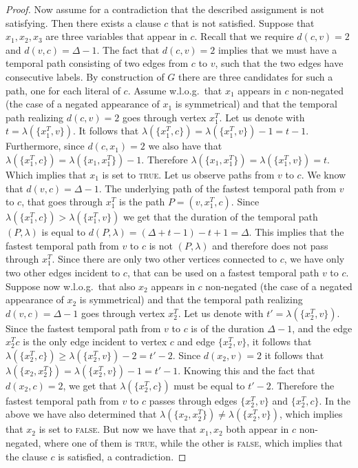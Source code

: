 \documentclass[a4paper,UKenglish,cleveref, autoref, thm-restate]{lipics-v2021}
\begin{document}
\begin{proof}
Now assume for a contradiction that the described assignment is not satisfying. Then there exists a clause $c$ that is not satisfied. 
Suppose that $x_1, x_2, x_3$ are three variables that appear in $c$.
Recall that we require $d(c,v)=2$ and $d(v,c)=\Delta -1$. 
The fact that $d(c,v)=2$ implies that we must have a temporal path consisting of two edges from $c$ to $v$, 
such that the two edges have consecutive labels. 
By construction of $G$ there are three candidates for such a path, one for each literal of $c$. 
Assume w.l.o.g.\ that $x_1$ appears in $c$ non-negated (the case of a negated appearance of $x_1$ is symmetrical) and that the temporal path realizing $d(c,v)=2$ goes through vertex $x_1^T$. 
Let us denote with $t = \lambda(\{x_1^T, v\})$.
It follows that $\lambda(\{x_1^T, c\})=\lambda(\{x_1^T, v\})-1 = t - 1$.
Furthermore, since $d(c,x_1)=2$ we also have that $\lambda(\{x_1^T, c\})=\lambda(\{x_1, x_1^T\})-1$. 
Therefore $\lambda(\{x_1, x_1^T\})=\lambda(\{x_1^T, v\}) = t$. 
Which implies that $x_1$ is set to \textsc{true}.
%
Let us observe paths from $v$ to $c$.
We know that $d(v,c)=\Delta -1$.
The underlying path of the fastest temporal path from $v$ to $c$, that goes through $x_1^T$ is the path $P = (v,x_1^T,c)$.
Since $\lambda(\{x_1^T,c\}) > \lambda(\{x_1^T, v\})$ we get that the duration of the temporal path $(P,\lambda)$ is equal to 
$d(P,\lambda)= (\Delta + t-1) - t + 1 = \Delta$.
This implies that
the fastest temporal path from $v$ to $c$ is not $(P,\lambda)$ and therefore does not pass through $x_1^T$.
Since there are only two other vertices connected to $c$, 
we have only two other edges incident to $c$, that can be used on a fastest temporal path
$v$ to $c$.
Suppose now w.l.o.g.\ that also $x_2$ appears in $c$ non-negated (the case of a negated appearance of $x_2$ is symmetrical) and that the temporal path realizing $d(v,c)=\Delta-1$ goes through vertex $x_2^T$.
Let us denote with $t' = \lambda(\{x_2^T, v\})$.
Since the fastest temporal path from $v$ to $c$ is of the duration $\Delta - 1$,
and the edge $x_2^T c$ is the only edge incident to vertex $c$ and edge $\{x_2^T, v\}$,
it follows that $\lambda(\{x_2^T, c\}) \geq \lambda(\{x_2^T, v\}) - 2 = t' - 2$.
Since $d(x_2,v) = 2$ it follows that $\lambda(\{x_2, x_2^T\}) = \lambda (\{x_2^T, v\}) - 1 = t' - 1$.
Knowing this and the fact that $d(x_2,c)=2$, we get that $\lambda(\{x_2^T, c\})$ must be equal to $t'-2$.
Therefore the fastest temporal path from $v$ to $c$ passes through edges $\{x_2^T,v\}$ and $\{x_2^T,c\}$.
In the above we have also determined that $\lambda(\{x_2,x_2^T\}) \neq \lambda ( \{x_2^T,v\})$,
which implies that $x_2$ is set to \textsc{false}.
But now we have that $x_1,x_2$ both appear in $c$ non-negated, where one of them is \textsc{true}, while the other is \textsc{false},
which implies that the clause $c$ is satisfied, a contradiction. 



\end{proof}
\end{document}
